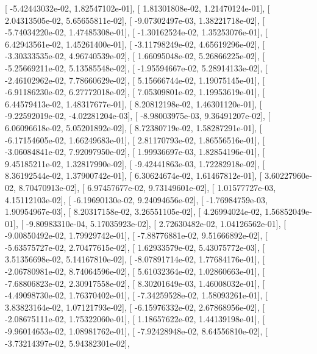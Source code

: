 \documentclass{article}
\begin{document}
       [ -5.42443032e-02,   1.82547102e-01],
       [  1.81301808e-02,   1.21470124e-01],
       [  2.04313505e-02,   5.65655811e-02],
       [ -9.07302497e-03,   1.38221718e-02],
       [ -5.74034220e-02,   1.47485308e-01],
       [ -1.30162524e-02,   1.35253076e-01],
       [  6.42943561e-02,   1.45261400e-01],
       [ -3.11798249e-02,   4.65619296e-02],
       [ -3.30333535e-02,   4.96740539e-02],
       [  1.66095048e-02,   5.26866225e-02],
       [ -5.25669211e-02,   5.13585548e-02],
       [ -1.95594667e-02,   5.28914133e-02],
       [ -2.46102962e-02,   7.78660629e-02],
       [  5.15666744e-02,   1.19075145e-01],
       [ -6.91186230e-02,   6.27772018e-02],
       [  7.05309801e-02,   1.19953619e-01],
       [  6.44579413e-02,   1.48317677e-01],
       [  8.20812198e-02,   1.46301120e-01],
       [ -9.22592019e-02,  -4.02281204e-03],
       [ -8.98003975e-03,   9.36491207e-02],
       [  6.06096618e-02,   5.05201892e-02],
       [  8.72380719e-02,   1.58287291e-01],
       [ -6.17154605e-02,   1.66249683e-01],
       [  2.81170793e-02,   1.86556516e-01],
       [ -3.06084841e-02,   7.92097950e-02],
       [  1.99936697e-03,   1.82854196e-01],
       [  9.45185211e-02,   1.32817990e-02],
       [ -9.42441863e-03,   1.72282918e-02],
       [  8.36192544e-02,   1.37900742e-01],
       [  6.30624674e-02,   1.61467812e-01],
       [  3.60227960e-02,   8.70470913e-02],
       [  6.97457677e-02,   9.73149601e-02],
       [  1.01577727e-03,   4.15112103e-02],
       [ -6.19690130e-02,   9.24094656e-02],
       [ -1.76984759e-03,   1.90954967e-03],
       [  8.20317158e-02,   3.26551105e-02],
       [  4.26994024e-02,   1.56852049e-01],
       [ -9.80983310e-04,   5.17035923e-02],
       [  2.72630482e-02,   1.04126562e-01],
       [ -9.00850492e-02,   1.79929742e-01],
       [ -7.88776881e-02,   9.51666892e-02],
       [ -5.63575727e-02,   2.70477615e-02],
       [  1.62933579e-02,   5.43075772e-03],
       [  3.51356698e-02,   5.14167810e-02],
       [ -8.07891714e-02,   1.77684176e-01],
       [ -2.06780981e-02,   8.74064596e-02],
       [  5.61032364e-02,   1.02860663e-01],
       [ -7.68806823e-02,   2.30917558e-02],
       [  8.30201649e-03,   1.46008032e-01],
       [ -4.49098730e-02,   1.76370402e-01],
       [ -7.34259528e-02,   1.58093261e-01],
       [  3.83823164e-02,   1.07121793e-02],
       [ -6.15976332e-02,   2.67868956e-02],
       [ -2.08675111e-02,   1.75322060e-01],
       [  1.18657622e-02,   1.44139198e-01],
       [ -9.96014653e-02,   1.08981762e-01],
       [ -7.92428948e-02,   8.64556810e-02],
       [ -3.73214397e-02,   5.94382301e-02],
\end{document}
